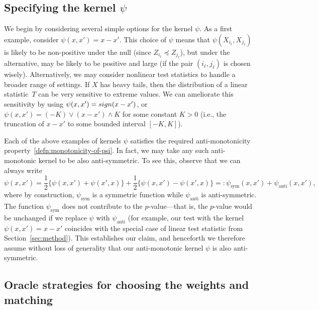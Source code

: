 \documentclass[12pt]{article}
\begin{document}
\subsection{Specifying the kernel \texorpdfstring{$\psi$}{psi}}

We begin by considering several simple options for the kernel $\psi$.  As a first example, consider $\psi(x,x') = x-x'$. This choice of $\psi$ means that $\psi(X_{i_\ell},X_{j_\ell})$ is likely to be non-positive under the null (since $Z_{i_\ell}\preceq Z_{j_\ell}$), but under the alternative, may be likely to be positive and large (if the pair $(i_\ell,j_\ell)$ is chosen wisely). Alternatively, we may consider nonlinear test statistics to handle a broader range of settings. If $X$ has heavy tails, then the distribution of a linear statistic~$T$ can be very sensitive to extreme values.  We can ameliorate this sensitivity by using $\psi(x,x') = \textnormal{sign}(x-x')$, or $\psi(x,x') = (-K) \vee (x-x') \wedge K$  for some constant $K > 0$ (i.e., the truncation of $x-x'$ to some bounded interval $[-K,K]$). 


Each of the above examples of kernels $\psi$ satisfies the required anti-monotonicity property~\eqref{defn:monotonicity-of-psi}.  In fact, we may take any such anti-monotonic kernel to be also anti-symmetric.  To see this, observe that we can always write
\[
    \psi(x,x') = \frac{1}{2}\bigl\{\psi(x,x') + \psi(x',x)\bigr\} + \frac{1}{2}\bigl\{\psi(x,x') - \psi(x',x)\bigr\} =: \psi_{\mathrm{sym}}(x,x') + \psi_{\mathrm{anti}}(x,x'), 
\]
where by construction, $\psi_{\mathrm{sym}}$ is a symmetric function while $\psi_{\mathrm{anti}}$ is anti-symmetric.  The function $\psi_{\mathrm{sym}}$ does not contribute to the $p$-value---that is, the $p$-value would be unchanged if we replace $\psi$ with $\psi_{\mathrm{anti}}$ (for example, our test with the kernel $\psi(x,x')=x-x'$ coincides with the special case of linear test statistic from Section~\ref{sec:method}). This establishes our claim, and henceforth we therefore assume without loss of generality that our anti-monotonic kernel $\psi$ is also anti-symmetric.


\subsection{Oracle strategies for choosing the weights and matching}\label{sec:oracle}
\end{document}
